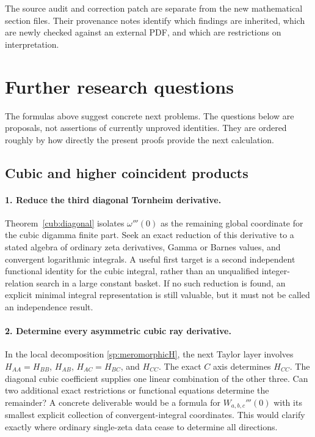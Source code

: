 \documentclass[11pt,a4paper]{article}
\theoremstyle{definition}
\theoremstyle{remark}
\numberwithin{equation}{section}
\begin{document}
The source audit and correction patch are separate from the new
mathematical section files. Their provenance notes identify which
findings are inherited, which are newly checked against an external
PDF, and which are restrictions on interpretation.


\section{Further research questions}
\label{future:sec}

The formulas above suggest concrete next problems. The questions below
are proposals, not assertions of currently unproved identities.
They are ordered roughly by how directly the present proofs provide
the next calculation.

\subsection{Cubic and higher coincident products}

\paragraph{1. Reduce the third diagonal Tornheim derivative.}
Theorem~\ref{cub:diagonal} isolates $\omega'''(0)$ as the remaining
global coordinate for the cubic digamma finite part. Seek an exact
reduction of this derivative to a stated algebra of ordinary zeta
derivatives, Gamma or Barnes values, and convergent logarithmic
integrals. A useful first target is a second independent functional
identity for the cubic integral, rather than an unqualified
integer-relation search in a large constant basket.
If no such reduction is found, an explicit minimal integral
representation is still valuable, but it must not be called an
independence result.

\paragraph{2. Determine every asymmetric cubic ray derivative.}
In the local decomposition \eqref{sp:meromorphicH}, the next Taylor
layer involves $H_{AA}=H_{BB}$, $H_{AB}$, $H_{AC}=H_{BC}$, and
$H_{CC}$. The exact $C$ axis determines $H_{CC}$.
The diagonal cubic coefficient supplies one linear combination of
the other three. Can two additional exact restrictions or functional
equations determine the remainder? A concrete deliverable would be
a formula for $W_{a,b,c}'''(0)$ with its smallest explicit collection
of convergent-integral coordinates. This would clarify exactly where
ordinary single-zeta data cease to determine all directions.
\end{document}
